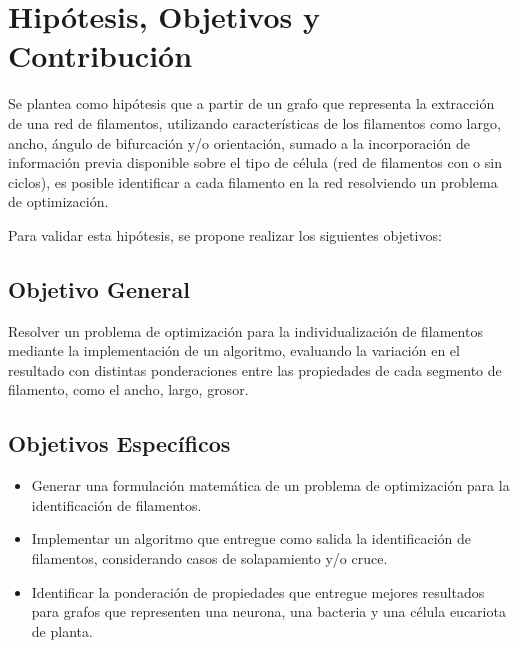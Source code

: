 \documentclass{article}
\begin{document}

\section{Hipótesis, Objetivos y Contribuci\'on}
\label{hipotesis}
Se plantea como hip\'otesis que a partir de un grafo que representa la extracci\'on de una red de filamentos, utilizando caracter\'isticas de los filamentos como largo, ancho, \'angulo de bifurcaci\'on y/o orientaci\'on, sumado a la incorporaci\'on de informaci\'on previa disponible sobre el tipo de c\'elula (red de filamentos con o sin ciclos), es posible identificar a cada filamento en la red resolviendo un problema de optimizaci\'on.

Para validar esta hip\'otesis, se propone realizar los siguientes objetivos:
\subsection{Objetivo General}
Resolver un problema de optimizaci\'on para la individualizaci\'on de filamentos mediante la implementaci\'on de un algoritmo, evaluando la variaci\'on en el resultado con distintas ponderaciones entre las propiedades de cada segmento de filamento, como el ancho, largo, grosor.

\subsection{Objetivos Espec\'ificos}
\begin{itemize}
    \item Generar una formulaci\'on matem\'atica de un problema de optimizaci\'on para la identificaci\'on de filamentos. 
    \item Implementar un algoritmo que entregue como salida la identificaci\'on de filamentos, considerando casos de solapamiento y/o cruce.
    \item Identificar la ponderaci\'on de propiedades que entregue mejores resultados para grafos que representen una neurona, una bacteria y una c\'elula eucariota de planta. 
    
\end{itemize}
\end{document}
